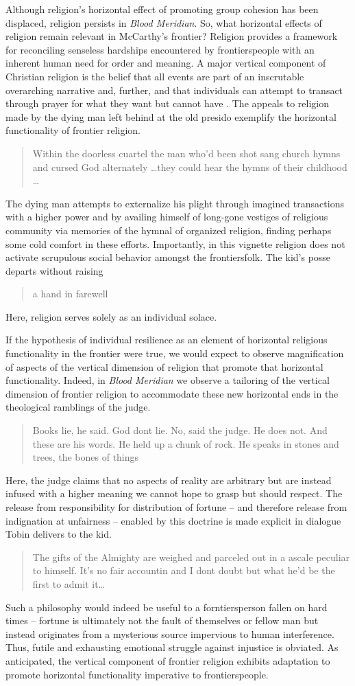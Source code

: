 Although religion's horizontal effect of promoting group cohesion has been displaced, religion persists in \textit{Blood Meridian}.
So, what horizontal effects of religion remain relevant in McCarthy's frontier? Religion provides a framework for reconciling senseless hardships encountered by frontierspeople with an inherent human need for order and meaning.
A major vertical component of Christian religion is the belief that all events are part of an inscrutable overarching narrative and, further, and that individuals can attempt to transact through prayer for what they want but cannot have \cite[p 240]{Wilson2007EvolutionLives}.
The appeals to religion made by the dying man left behind at the old presido exemplify the horizontal functionality of frontier religion.
\blockcquote[p 119]{McCarthy1992BloodWest}{Within the doorless cuartel the man who'd been shot sang church hymns and cursed God alternately \ldots they could hear the hymns of their childhood \ldots}.
The dying man attempts to externalize his plight through imagined transactions with a higher power and by availing himself of long-gone vestiges of religious community via memories of the hymnal of organized religion, finding perhaps some cold comfort in these efforts.
Importantly, in this vignette religion does not activate scrupulous social behavior amongst the frontiersfolk. The kid's posse departs without raising \blockcquote[p 119]{McCarthy1992BloodWest}{a hand in farewell}.
Here, religion serves solely as an individual solace.

If the hypothesis of individual resilience as an element of horizontal religious functionality in the frontier were true, we would expect to observe magnification of aspects of the vertical dimension of religion that promote that horizontal functionality.
Indeed, in \textit{Blood Meridian} we observe a tailoring of the vertical dimension of frontier religion to accommodate these new horizontal ends in the theological ramblings of the judge.
\blockcquote[p 116]{McCarthy1992BloodWest}{Books lie, he said.
God dont lie.
No, said the judge.
He does not.
And these are his words.
He held up a chunk of rock.
He speaks in stones and trees, the bones of things}.
Here, the judge claims that no aspects of reality are arbitrary but are instead infused with a higher meaning we cannot hope to grasp but should respect.
The release from responsibility for distribution of fortune -- and therefore release from indignation at unfairness -- enabled by this doctrine is made explicit in dialogue Tobin delivers to the kid.
\blockcquote[p 123]{McCarthy1992BloodWest}{The gifts of the Almighty are weighed and parceled out in a ascale peculiar to himself.
It's no fair accountin and I dont doubt but what he'd be the first to admit it\ldots}.
Such a philosophy would indeed be useful to a forntiersperson fallen on hard times -- fortune is ultimately not the fault of themselves or fellow man but instead originates from a mysterious source impervious to human interference.
Thus, futile and exhausting emotional struggle against injustice is obviated.
As anticipated, the vertical component of frontier religion exhibits adaptation to promote horizontal functionality imperative to frontierspeople.
